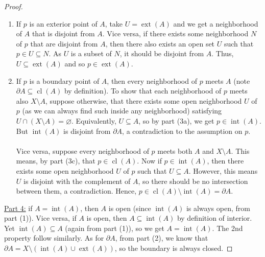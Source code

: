\documentclass{treatise}
\begin{document}
\begin{proof}
\begin{enumerate}[label=(\alph*)]
    \item If $p$ is an exterior point of $A$, take $U = \operatorname{ext}(A)$ and we get a neighborhood of $A$ that is disjoint from $A$. Vice versa, if there exists some neighborhood $N$ of $p$ that are disjoint from $A$, then there also exists an open set $U$ such that $p \in U \subseteq N$. As $U$ is a subset of $N$, it should be disjoint from $A$. Thus, $U \subseteq \operatorname{ext}(A)$ and so $p \in \operatorname{ext}(A)$.
    \item If $p$ is a boundary point of $A$, then every neighborhood of $p$ meets $A$ (note $\partial A \subseteq \operatorname{cl}(A)$ by definition). To show that each neighborhood of $p$ meets also $X \setminus A$, suppose otherwise, that there exists some open neighborhood $U$ of $p$ (as we can always find such inside any neighborhood) satisfying $U \cap (X \setminus A) = \varnothing$. Equivalently, $U \subseteq A$, so by part (3a), we get $p \in \operatorname{int}(A)$. But $\operatorname{int}(A)$ is disjoint from $\partial A$, a contradiction to the assumption on $p$.
    \\
    \\
    Vice versa, suppose every neighborhood of $p$ meets both $A$ and $X \setminus A$. This means, by part (3c), that $p \in \operatorname{cl}(A)$. Now if $p \in \operatorname{int}(A)$, then there exists some open neighborhood $U$ of $p$ such that $U \subseteq A$. However, this means $U$ is disjoint with the complement of $A$, so there should be no intersection between them, a contradiction. Hence, $p \in \operatorname{cl}(A) \setminus \operatorname{int}(A) = \partial A$.
\end{enumerate}
\underline{Part 4:} if $A = \operatorname{int}(A)$, then $A$ is open (since $\operatorname{int}(A)$ is always open, from part (1)). Vice versa, if $A$ is open, then $A \subseteq \operatorname{int}(A)$ by definition of interior. Yet $\operatorname{int}(A) \subseteq A$ (again from part (1)), so we get $A = \operatorname{int}(A)$. The 2nd property follow similarly. As for $\partial A$, from part (2), we know that $\partial A = X \setminus (\operatorname{int}(A) \cup \operatorname{ext}(A))$, so the boundary is always closed.
\end{proof}
\end{document}
